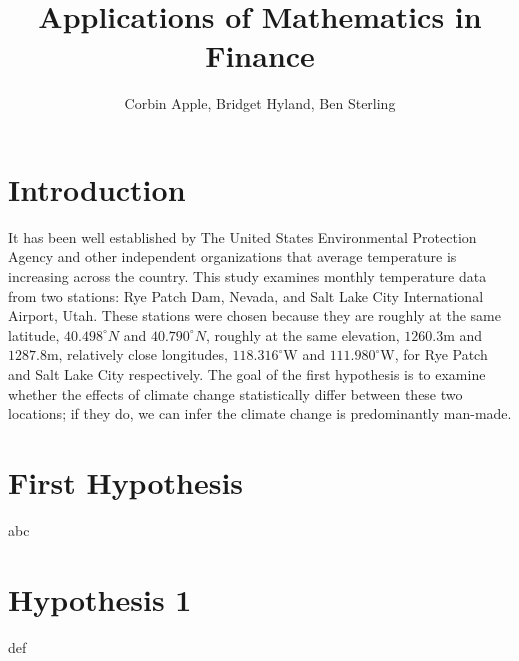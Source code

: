\documentclass[final]{siamart1116}
\title{Applications of Mathematics in Finance}
\author{Corbin Apple, Bridget Hyland, Ben Sterling}
\begin{document}
\maketitle

\section{Introduction}

It has been well established by The United States Environmental Protection Agency and other independent organizations that average temperature is increasing across the country. This study examines monthly temperature data from two stations: Rye Patch Dam, Nevada, and Salt Lake City International Airport, Utah. These stations were chosen because they are roughly at the same latitude, $40.498^{\circ}N$ and $40.790^{\circ}N$, roughly at the same elevation, $1260.3$m and $1287.8$m, relatively close longitudes, $118.316^{\circ}$W and $111.980^{\circ}$W, for Rye Patch and Salt Lake City respectively. The goal of the first hypothesis is to examine whether the effects of climate change statistically differ between these two locations; if they do, we can infer the climate change is predominantly man-made.

\section{First Hypothesis}

abc

\section{Hypothesis 1}

def

\tiny



\end{document}
